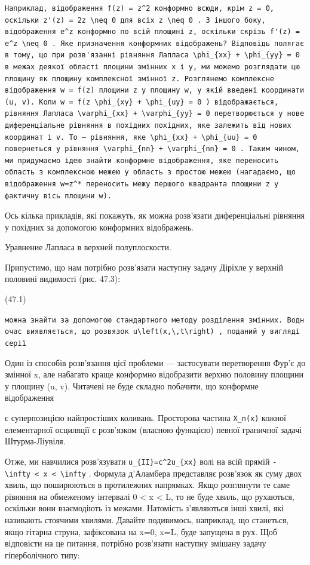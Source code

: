 \documentclass[
  ukrainian,
]{article}
\begin{document}
\begin{verbatim}
Наприклад, відображення f(z) = z^2 конформно всюди, крім z = 0, оскільки z'(z) = 2z \neq 0 для всіх z \neq 0 . З іншого боку, відображення e^z конформно по всій площині z, оскільки скрізь f'(z) = e^z \neq 0 . Яке призначення конформних відображень? Відповідь полягає в тому, що при розв'язанні рівняння Лапласа \phi_{xx} + \phi_{yy} = 0 в межах деякої області площини змінних x і y, ми можемо розглядати цю площину як площину комплексної змінної z. Розглянемо комплексне відображення w = f(z) площини z у площину w, у якій введені координати (u, v). Коли w = f(z \phi_{xy} + \phi_{uy} = 0 ) відображається, рівняння Лапласа \varphi_{xx} + \varphi_{yy} = 0 перетворюється у нове диференціальне рівняння в похідних похідних, яке залежить від нових координат і v. To — рівняння, яке \phi_{xx} + \phi_{uu} = 0 повернеться у рівняння \varphi_{nn} + \varphi_{nn} = 0 . Таким чином, ми придумаємо ідею знайти конформне відображення, яке переносить область з комплексною межею у область з простою межею (нагадаємо, що відображення w=z^* переносить межу першого квадранта площини z у фактичну вісь площини w).
\end{verbatim}

Ось кілька прикладів, які покажуть, як можна розв'язати диференціальні
рівняння у похідних за допомогою конформних відображень.

Уравнение Лапласа в верхней полуплоскости.

Припустимо, що нам потрібно розв'язати наступну задачу Діріхле у верхній
половині видимості (рис. 47.3):

(47.1)

\texttt{можна\ знайти\ за\ допомогою\ стандартного\ методу\ розділення\ змінних.\ Водночас\ виявляється,\ що\ розв\textquotesingle{}язок\ \textquotesingle{}u\textbackslash{}left(x,\textbackslash{},t\textbackslash{}right)\textquotesingle{}\ ,\ поданий\ у\ вигляді\ серії}

Один із способів розв'язання цієї проблеми --- застосувати перетворення
Фур'є до змінної x, але набагато краще конформно відобразити верхню
половину площини у площину (u, v). Читачеві не буде складно побачити, що
конформне відображення

є суперпозицією найпростіших коливань. Просторова частина
\texttt{X\_n(x)} кожної елементарної осциляції є розв'язком (власною
функцією) певної граничної задачі Штурма-Ліувіля.

Отже, ми навчилися розв'язувати \texttt{u\_\{II\}=c\^{}2u\_\{xx\}} волі
на всій прямій
\texttt{-\textbackslash{}infty\ \textless{}\ x\ \textless{}\ \textbackslash{}infty}
. Формула д'Аламбера представляє розв'язок як суму двох хвиль, що
поширюються в протилежних напрямках. Якщо розглянути те саме рівняння на
обмеженому інтервалі 0 \textless{} x \textless{} L, то не буде хвиль, що
рухаються, оскільки вони взаємодіють із межами. Натомість з'являються
інші хвилі, які називають стоячими хвилями. Давайте подивимось,
наприклад, що станеться, якщо гітарна струна, зафіксована на x=0, x=L,
буде запущена в рух. Щоб відповісти на це питання, потрібно розв'язати
наступну змішану задачу гіперболічного типу:
\end{document}
